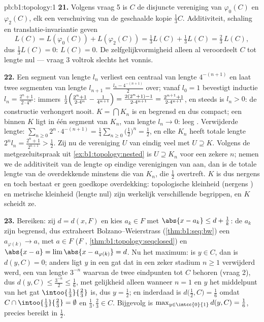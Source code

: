 \begin{solution}{pb:b1:topology:1}
\textbf{21.} Volgens vraag 5 is $C$ de disjuncte vereniging van
$\varphi_0(C)$ en $\varphi_2(C)$, elk een verschuiving van de geschaalde
kopie $\frac13 C$. Additiviteit, schaling en translatie-invariantie geven
\[
L(C) = L(\varphi_0(C)) + L(\varphi_2(C))
= \tfrac13 L(C) + \tfrac13 L(C) = \tfrac23\,L(C),
\]
dus $\frac13 L(C) = 0$: $L(C) = 0$. De zelfgelijkvormigheid alleen al
veroordeelt $C$ tot lengte nul --- vraag 3 voltrok slechts het vonnis.

\textbf{22.} Een segment van lengte $l_n$ verliest een centraal 
van lengte $4^{-(n+1)}$ en laat twee segmenten van lengte $l_{n+1} =
\frac{l_n - 4^{-(n+1)}}{2}$ over; vanaf $l_0 = 1$ bevestigt inductie $l_n
= \frac{2^n + 1}{2\cdot4^n}$: immers
$\frac12\Bigl(\frac{2^n+1}{2\cdot4^n} - \frac{1}{4^{n+1}}\Bigr) =
\frac{2(2^n + 1) - 1}{2\cdot4^{n+1}} = \frac{2^{n+1} +
1}{2\cdot4^{n+1}}$, en steeds is $l_n > 0$: de constructie verhongert
nooit. $K = \bigcap K_n$ is  en begrensd en dus compact; een
 binnen $K$ ligt in één segment van $K_n$, van lengte $l_n \to
0$: leeg . Verwijderde lengte: $\sum_{n\geq0} 2^n \cdot
4^{-(n+1)} = \frac14\sum_{n\geq0}\bigl(\frac12\bigr)^n = \frac12$, en
elke $K_n$ heeft totale lengte $2^n l_n = \frac{2^n + 1}{2^{n+1}} >
\frac12$. Zij nu de vereniging $U$ van eindig veel   met
$U \supseteq K$. Volgens de metgezeluitspraak uit
\cref{ex:b1:topology:nested} is $U \supseteq K_n$ voor een zekere $n$;
nemen we de additiviteit van de lengte op eindige verenigingen van
 aan, dan is de totale lengte van de overdekkende 
minstens die van $K_n$, die $\frac12$ overtreft. $K$ is dus nergens 
en toch bestaat er geen goedkope overdekking: topologische kleinheid
(nergens ) en metrische kleinheid (lengte nul) zijn werkelijk
verschillende begrippen, en $K$ scheidt ze.

\textbf{23.} Bereiken: zij $d = d(x, F)$ en kies $a_k \in F$ met $\abs{x
- a_k} \leq d + \frac1k$: de $a_k$ zijn begrensd, dus extraheert
Bolzano--Weierstrass (\cref{thm:b1:seq:bw}) een $a_{\varphi(k)} \to a$,
met $a \in F$ ($F$ , \cref{thm:b1:topology:seqclosed}) en $\abs{x
- a} = \lim \abs{x - a_{\varphi(k)}} = d$. Nu het maximum: is $y \in C$,
dan is $d(y, C) = 0$; anders ligt $y$ in een gat dat in een zeker stadium
$n \geq 1$ verwijderd werd, een   van lengte $3^{-n}$
waarvan de twee eindpunten tot $C$ behoren (vraag 2), dus $d(y, C) \leq
\frac{3^{-n}}{2} \leq \frac16$, met gelijkheid alleen wanneer $n = 1$ en
$y$ het middelpunt van het gat $\intoo{\frac13}{\frac23}$ is, dus $y =
\frac12$; en inderdaad is $d\bigl(\frac12, C\bigr) = \frac16$ omdat $C
\cap \intoo{\frac13}{\frac23} = \emptyset$ en $\frac13, \frac23 \in C$.
Bijgevolg is $\max_{y\in\intcc{0}{1}} d(y, C) = \frac16$, precies bereikt
in $\frac12$.


\end{solution}
